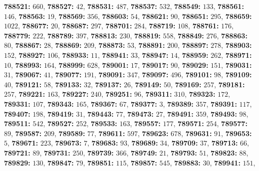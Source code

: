 \textsf{\bfseries 788521:} $660$, \textsf{\bfseries 788527:} $42$, \textsf{\bfseries 788531:} $487$, \textsf{\bfseries 788537:} $532$, \textsf{\bfseries 788549:} $133$, \textsf{\bfseries 788561:} $146$, \textsf{\bfseries 788563:} $19$, \textsf{\bfseries 788569:} $356$, \textsf{\bfseries 788603:} $54$, \textsf{\bfseries 788621:} $90$, \textsf{\bfseries 788651:} $295$, \textsf{\bfseries 788659:} $1022$, \textsf{\bfseries 788677:} $20$, \textsf{\bfseries 788687:} $297$, \textsf{\bfseries 788701:} $284$, \textsf{\bfseries 788719:} $108$, \textsf{\bfseries 788761:} $176$, \textsf{\bfseries 788779:} $222$, \textsf{\bfseries 788789:} $397$, \textsf{\bfseries 788813:} $230$, \textsf{\bfseries 788819:} $558$, \textsf{\bfseries 788849:} $276$, \textsf{\bfseries 788863:} $80$, \textsf{\bfseries 788867:} $28$, \textsf{\bfseries 788869:} $209$, \textsf{\bfseries 788873:} $53$, \textsf{\bfseries 788891:} $200$, \textsf{\bfseries 788897:} $278$, \textsf{\bfseries 788903:} $152$, \textsf{\bfseries 788927:} $106$, \textsf{\bfseries 788933:} $11$, \textsf{\bfseries 788941:} $33$, \textsf{\bfseries 788947:} $14$, \textsf{\bfseries 788959:} $262$, \textsf{\bfseries 788971:} $10$, \textsf{\bfseries 788993:} $164$, \textsf{\bfseries 788999:} $628$, \textsf{\bfseries 789001:} $17$, \textsf{\bfseries 789017:} $90$, \textsf{\bfseries 789029:} $151$, \textsf{\bfseries 789031:} $31$, \textsf{\bfseries 789067:} $41$, \textsf{\bfseries 789077:} $191$, \textsf{\bfseries 789091:} $347$, \textsf{\bfseries 789097:} $496$, \textsf{\bfseries 789101:} $98$, \textsf{\bfseries 789109:} $40$, \textsf{\bfseries 789121:} $58$, \textsf{\bfseries 789133:} $32$, \textsf{\bfseries 789137:} $26$, \textsf{\bfseries 789149:} $50$, \textsf{\bfseries 789169:} $257$, \textsf{\bfseries 789181:} $257$, \textsf{\bfseries 789221:} $163$, \textsf{\bfseries 789227:} $240$, \textsf{\bfseries 789251:} $96$, \textsf{\bfseries 789311:} $310$, \textsf{\bfseries 789323:} $172$, \textsf{\bfseries 789331:} $107$, \textsf{\bfseries 789343:} $165$, \textsf{\bfseries 789367:} $67$, \textsf{\bfseries 789377:} $3$, \textsf{\bfseries 789389:} $357$, \textsf{\bfseries 789391:} $117$, \textsf{\bfseries 789407:} $198$, \textsf{\bfseries 789419:} $31$, \textsf{\bfseries 789443:} $77$, \textsf{\bfseries 789473:} $27$, \textsf{\bfseries 789491:} $359$, \textsf{\bfseries 789493:} $98$, \textsf{\bfseries 789511:} $542$, \textsf{\bfseries 789527:} $252$, \textsf{\bfseries 789533:} $163$, \textsf{\bfseries 789557:} $177$, \textsf{\bfseries 789571:} $254$, \textsf{\bfseries 789577:} $89$, \textsf{\bfseries 789587:} $209$, \textsf{\bfseries 789589:} $77$, \textsf{\bfseries 789611:} $597$, \textsf{\bfseries 789623:} $678$, \textsf{\bfseries 789631:} $91$, \textsf{\bfseries 789653:} $5$, \textsf{\bfseries 789671:} $223$, \textsf{\bfseries 789673:} $7$, \textsf{\bfseries 789683:} $93$, \textsf{\bfseries 789689:} $34$, \textsf{\bfseries 789709:} $37$, \textsf{\bfseries 789713:} $66$, \textsf{\bfseries 789721:} $89$, \textsf{\bfseries 789731:} $250$, \textsf{\bfseries 789739:} $366$, \textsf{\bfseries 789749:} $21$, \textsf{\bfseries 789793:} $51$, \textsf{\bfseries 789823:} $88$, \textsf{\bfseries 789829:} $130$, \textsf{\bfseries 789847:} $79$, \textsf{\bfseries 789851:} $115$, \textsf{\bfseries 789857:} $545$, \textsf{\bfseries 789883:} $30$, \textsf{\bfseries 789941:} $151$, 
